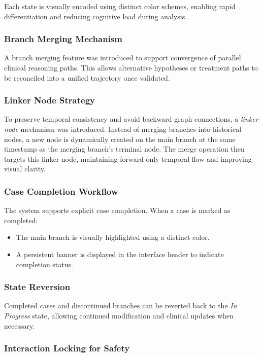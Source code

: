 \documentclass{article}
\begin{document}
Each state is visually encoded using distinct color schemes, enabling rapid differentiation and reducing cognitive load during analysis.

\subsubsection{Branch Merging Mechanism}

A branch merging feature was introduced to support convergence of parallel clinical reasoning paths. This allows alternative hypotheses or treatment paths to be reconciled into a unified trajectory once validated.

\subsubsection{Linker Node Strategy}

To preserve temporal consistency and avoid backward graph connections, a \textit{linker node} mechanism was introduced. Instead of merging branches into historical nodes, a new node is dynamically created on the main branch at the same timestamp as the merging branch's terminal node. The merge operation then targets this linker node, maintaining forward-only temporal flow and improving visual clarity.

\subsubsection{Case Completion Workflow}

The system supports explicit case completion. When a case is marked as completed:
\begin{itemize}
    \item The main branch is visually highlighted using a distinct color.
    \item A persistent banner is displayed in the interface header to indicate completion status.
\end{itemize}

\subsubsection{State Reversion}

Completed cases and discontinued branches can be reverted back to the \textit{In Progress} state, allowing continued modification and clinical updates when necessary.

\subsubsection{Interaction Locking for Safety}
\end{document}
